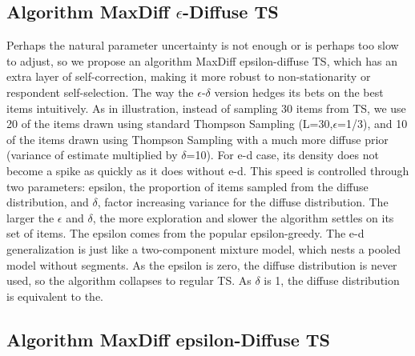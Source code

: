 \documentclass[mksc,blindrev]{informs3} %
\begin{document}
\subsection{Algorithm MaxDiff $\epsilon$-Diffuse TS}
Perhaps the natural parameter uncertainty is not enough or is perhaps too slow to adjust, so we propose an algorithm MaxDiff epsilon-diffuse TS, which has an extra layer of self-correction, making it more robust to non-stationarity or respondent self-selection. 
The way the $\epsilon$-$\delta$ version hedges its bets on the best items intuitively. As in illustration, instead of sampling 30 items from TS, we use 20 of the items drawn using standard Thompson Sampling (L=30,$\epsilon$=1/3), and 10 of the items drawn using Thompson Sampling with a much more diffuse prior (variance of estimate multiplied by $\delta$=10).
For e-d case, its density does not become a spike as quickly as it does without e-d. This speed is controlled through two parameters: epsilon, the proportion of items sampled from the diffuse distribution, and $\delta$, factor increasing variance for the diffuse distribution.  The larger the $\epsilon$ and $\delta$, the more exploration and slower the algorithm settles on its set of items. The epsilon comes from the popular epsilon-greedy. 
The e-d generalization is just like a two-component mixture model, which nests a pooled model without segments. As the epsilon is zero, the diffuse distribution is never used, so the algorithm collapses to regular TS. As $\delta$ is 1, the diffuse distribution is equivalent to the. 
\subsection{Algorithm MaxDiff epsilon-Diffuse TS}
\begin{algorithmic}
  \ENDFOR
{}
\ENDFOR
\end{algorithmic}
\end{document}
